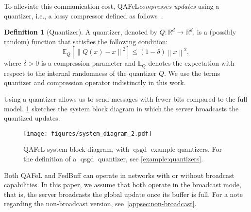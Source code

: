 \documentclass[nohyperref]{article}
\theoremstyle{plain}
\theoremstyle{definition}
\newtheorem{definition}[theorem]{Definition}
\theoremstyle{remark}
\newcommand{\algname}{{QAFeL}\xspace} %
\newcommand{\norm}[1]{\left\lVert#1\right\rVert}
\DeclareMathOperator{\qsgd}{qsgd}
\begin{document}
To alleviate this communication cost, \algname \emph{compresses updates} using a quantizer, i.e., a lossy compressor defined as follows~\cite{error_feedback, optimal_compression, new_simpler_ef}.
\begin{definition}[Quantizer] \label{def:quantization}
    A quantizer, denoted by $Q: \mathbb{R}^d \to \mathbb{R}^d$, is a (possibly random) function that satisfies the following condition:
    \begin{equation} \label{eq:quantization}
        \mathbb{E}_Q \left[ \norm{Q(x) - x}^2 \right] \leq (1-\delta) \norm{x}^2,
    \end{equation}
    where $\delta > 0$ is a compression parameter and $\mathbb{E}_Q$ denotes the expectation with respect to the internal randomness of the quantizer $Q$.
    We use the terms quantizer and compression operator indistinctly in this work.
\end{definition}
Using a quantizer allows us to send messages with fewer bits compared to the full model.
\cref{fig:system_block_diagram} sketches the system block diagram in which the server broadcasts the quantized updates.
\begin{figure}[htbp]
    \centering
    \texttt{[image: figures/system\_diagram\_2.pdf]}
    \caption{\algname system block diagram, with $\qsgd$ example quantizers. For the definition of a $\qsgd$ quantizer, see \cref{example:quantizers}.}
    \label{fig:system_block_diagram}
\end{figure}
Both \algname and FedBuff can operate in networks with or without broadcast capabilities.
In this paper, we assume that both operate in the broadcast mode, that is, the server broadcasts the global update once its buffer is full.
For a note regarding the non-broadcast version, see~\cref{appsec:non-broadcast}.
\end{document}
